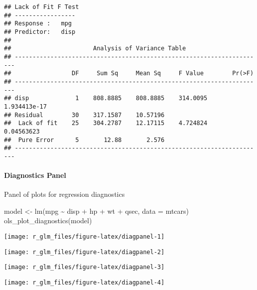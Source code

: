 \documentclass[
]{article}
\newenvironment{Shaded}{\begin{snugshade}}{\end{snugshade}}
\newcommand{\AttributeTok}[1]{\textcolor[rgb]{0.77,0.63,0.00}{#1}}
\newcommand{\FunctionTok}[1]{\textcolor[rgb]{0.00,0.00,0.00}{#1}}
\newcommand{\NormalTok}[1]{#1}
\newcommand{\OtherTok}[1]{\textcolor[rgb]{0.56,0.35,0.01}{#1}}
\newcommand{\SpecialCharTok}[1]{\textcolor[rgb]{0.00,0.00,0.00}{#1}}
\begin{document}
\begin{verbatim}
## Lack of Fit F Test 
## -----------------
## Response :   mpg 
## Predictor:   disp 
## 
##                       Analysis of Variance Table                       
## ----------------------------------------------------------------------
##                 DF     Sum Sq     Mean Sq     F Value        Pr(>F)    
## ----------------------------------------------------------------------
## disp             1    808.8885    808.8885    314.0095    1.934413e-17 
## Residual        30    317.1587    10.57196                             
##  Lack of fit    25    304.2787    12.17115    4.724824      0.04563623 
##  Pure Error      5       12.88       2.576                             
## ----------------------------------------------------------------------
\end{verbatim}

\hypertarget{diagnostics-panel}{%
\paragraph{Diagnostics Panel}\label{diagnostics-panel}}

Panel of plots for regression diagnostics

\begin{Shaded}
\begin{Highlighting}[]
\NormalTok{model }\OtherTok{\textless{}{-}} \FunctionTok{lm}\NormalTok{(mpg }\SpecialCharTok{\textasciitilde{}}\NormalTok{ disp }\SpecialCharTok{+}\NormalTok{ hp }\SpecialCharTok{+}\NormalTok{ wt }\SpecialCharTok{+}\NormalTok{ qsec, }\AttributeTok{data =}\NormalTok{ mtcars)}
\FunctionTok{ols\_plot\_diagnostics}\NormalTok{(model)}
\end{Highlighting}
\end{Shaded}

\begin{center}\texttt{[image: r\_glm\_files/figure-latex/diagpanel-1]} \end{center}

\begin{center}\texttt{[image: r\_glm\_files/figure-latex/diagpanel-2]} \end{center}

\begin{center}\texttt{[image: r\_glm\_files/figure-latex/diagpanel-3]} \end{center}

\begin{center}\texttt{[image: r\_glm\_files/figure-latex/diagpanel-4]} \end{center}
\end{document}
